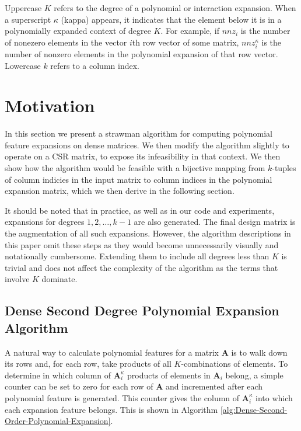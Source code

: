 \documentclass[journal]{journal}
\begin{document}
Uppercase $K$ refers to the degree of a polynomial or interaction expansion.
When a superscript $\kappa$ (kappa) appears, it indicates that the element below it is in a polynomially expanded context of degree $K$.
For example, if $nnz_i$ is the number of nonezero elements in the vector $i$th row vector of some matrix, $nnz_i^\kappa$ is the number of nonzero elements in the polynomial expansion of that row vector.
Lowercase $k$ refers to a column index.

\section{Motivation}
In this section we present a strawman algorithm for computing polynomial feature expansions on dense matrices.
We then modify the algorithm  slightly to operate on a CSR matrix, to expose its infeasibility in that context.
We then show how the algorithm would be feasible with a bijective mapping from $k$-tuples of column indicies in the input matrix to column indices in the polynomial expansion matrix, which we then derive in the following section.

It should be noted that in practice, as well as in our code and experiments, expansions for degrees $1, 2, \dots, k-1$ are also generated.
The final design matrix is the augmentation of all such expansions.
However, the algorithm descriptions in this paper omit these steps as they would become unnecessarily visually and notationally cumbersome.
Extending them to include all degrees less than $K$ is trivial and does not affect the complexity of the algorithm as the terms that involve $K$ dominate.

\subsection{Dense Second Degree Polynomial Expansion Algorithm}
A natural way to calculate polynomial features for a matrix $\bm{A}$ is to walk down its rows and, for each row, take products of all $K$-combinations of elements.
To determine in which column of $\bm{A}^\kappa_i$ products of elements in $\bm{A}_i$ belong, a simple counter can be set to zero for each row of $\bm{A}$ and incremented after each polynomial feature is generated.
This counter gives the column of $\bm{A}^\kappa_i$ into which each expansion feature belongs.
This is shown in Algorithm \ref{alg:Dense-Second-Order-Polynomial-Expansion}.

\end{document}

